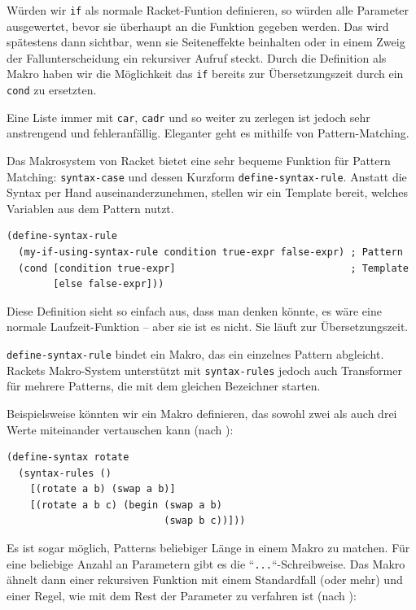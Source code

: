 Würden wir \texttt{if} als normale Racket-Funtion definieren, so würden alle Parameter ausgewertet, bevor sie überhaupt an die Funktion gegeben werden. Das wird spätestens dann sichtbar, wenn sie Seiteneffekte beinhalten oder in einem Zweig der Fallunterscheidung ein rekursiver Aufruf steckt. Durch die Definition als Makro haben wir die Möglichkeit das \texttt{if} bereits zur Übersetzungszeit durch ein \texttt{cond} zu ersetzten.


Eine Liste immer mit \texttt{car}, \texttt{cadr} und so weiter zu zerlegen ist jedoch sehr anstrengend und fehleranfällig. Eleganter geht es mithilfe von Pattern-Matching. %


Das Makrosystem von Racket bietet eine sehr bequeme Funktion für Pattern Matching: \texttt{syntax-case} und dessen Kurzform \texttt{define-syntax-rule}. Anstatt die Syntax per Hand auseinanderzunehmen, stellen wir ein Template bereit, welches Variablen aus dem Pattern nutzt.

\begin{lstlisting}
(define-syntax-rule 
  (my-if-using-syntax-rule condition true-expr false-expr) ; Pattern
  (cond [condition true-expr]                              ; Template
        [else false-expr]))
\end{lstlisting}

Diese Definition sieht so einfach aus, dass man denken könnte, es wäre eine normale Laufzeit-Funktion -- aber sie ist es nicht. Sie läuft zur Übersetzungszeit. 


\texttt{define-syntax-rule} bindet ein Makro, das ein einzelnes Pattern abgleicht. Rackets Makro-System unterstützt mit \texttt{syntax-rules} jedoch auch Transformer für mehrere Patterns, die mit dem gleichen Bezeichner starten.

Beispielsweise könnten wir ein Makro definieren, das sowohl zwei als auch drei Werte miteinander vertauschen kann (nach \cite{racketguide-macros}):

\begin{lstlisting}
(define-syntax rotate
  (syntax-rules ()
    [(rotate a b) (swap a b)]
    [(rotate a b c) (begin (swap a b)
                           (swap b c))]))
\end{lstlisting}

Es ist sogar möglich, Patterns beliebiger Länge in einem Makro zu matchen. Für eine beliebige Anzahl an Parametern gibt es die ``\texttt{...}``-Schreibweise. Das Makro ähnelt dann einer rekursiven Funktion mit einem Standardfall (oder mehr) und einer Regel, wie mit dem Rest der Parameter zu verfahren ist (nach \cite{racketguide-macros}):

